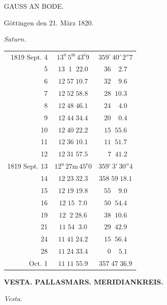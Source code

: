 \par{}\bigskip
\hypertarget{native-433-part-lower}{}
\begin{center}
{\Large GAUSS AN BODE.}
\end{center}

\hfill Göttingen den 21. März 1820.

\begin{center}
\emph{Saturn.}
\end{center}

\begin{center}
\begin{tabular}{r|c|c}
1819 Sept. 4 & $13^{\mathrm u}\,5^{\mathrm m}\,43^{\mathrm s}9$ & $359^\circ\,40'\,2''7$ \\
5 & $13\;\;1\;\;22.0$ & $36\;\;\;\;2.7$ \\
6 & $12\;57\;10.7$ & $32\;\;\;\;9.6$ \\
7 & $12\;52\;58.8$ & $28\;\;10.3$ \\
8 & $12\;48\;46.1$ & $24\;\;\;\;4.0$ \\
9 & $12\;44\;34.4$ & $20\;\;\;\;0.4$ \\
10 & $12\;40\;22.2$ & $15\;\;55.6$ \\
11 & $12\;36\;10.1$ & $11\;\;51.7$ \\
12 & $12\;31\;57.5$ & $\;\;7\;\;41.2$ \\
\hline
1819 Sept. 13 & $12^{\mathrm u}\,27\mathrm{m}\,45^{\mathrm s}0$ & $359^\circ\,3'\,30''4$ \\
14 & $12\;23\;32.3$ & $358\;59\;18.1$ \\
15 & $12\;19\;19.8$ & $55\;\;\;\;9.0$ \\
16 & $12\;15\;\;7.0$ & $50\;\;54.4$ \\
19 & $12\;\;2\;28.6$ & $38\;\;10.6$ \\
21 & $11\;54\;\;3.0$ & $29\;\;42.9$ \\
24 & $11\;41\;24.2$ & $15\;\;56.4$ \\
28 & $11\;24\;33.4$ & $\;\;0\;\;\;\;5.1$ \\
Oct. 1 & $11\;11\;55.9$ & $357\;47\;36.9$ \\
\end{tabular}
\end{center}

\clearpage
\noindent{}%
\makebox[12mm][l]{}%
\parbox[t]{\dimexpr\linewidth-24mm\relax}{\centering\footnotesize\bfseries VESTA. PALLAS\enspace MARS. MERIDIANKREIS.\par}%
\par\nobreak\medskip
\begin{center}
\textit{Vesta.}
\end{center}

